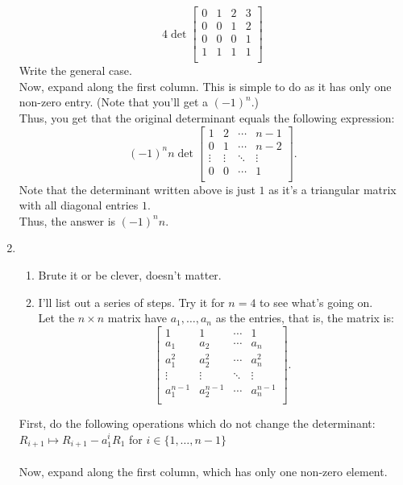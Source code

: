 \documentclass{article}
\begin{document}
\begin{enumerate}
\[	4\det \begin{bmatrix}
		0 & 1 & 2 & 3\\
		0 & 0 & 1 & 2\\
		0 & 0 & 0 & 1\\
		1 & 1 & 1 & 1\\
	\end{bmatrix}\]
	Write the general case.\\
	Now, expand along the first column. This is simple to do as it has only one non-zero entry. (Note that you'll get a $(-1)^n$.)\\
	Thus, you get that the original determinant equals the following expression:
	\[(-1)^nn\det \begin{bmatrix}
		1 & 2 & \cdots & n-1\\
		0 & 1 & \cdots & n-2\\
		\vdots & \vdots & \ddots & \vdots \\
		0 & 0 & \cdots & 1\\
	\end{bmatrix}.\]
	Note that the determinant written above is just $1$ as it's a triangular matrix with all diagonal entries $1.$\\
	Thus, the answer is $(-1)^nn.$
	\item 
	\begin{enumerate} 
		\item Brute it or be clever, doesn't matter.
		\item I'll list out a series of steps. Try it for $n = 4$ to see what's going on.\\
		Let the $n \times n$ matrix have $a_1, \ldots, a_n$ as the entries, that is, the matrix is:
		\[\begin{bmatrix}
			1 & 1 & \cdots & 1\\
			a_1 & a_2 & \cdots & a_n\\
			a_1^2 & a_2^2 & \cdots & a_n^2\\
			\vdots & \vdots & \ddots & \vdots \\
			a_1^{n-1} & a_2^{n-1} & \cdots & a_n^{n-1}\\
		\end{bmatrix}.\]
	\end{enumerate}
	First, do the following operations which do not change the determinant:\\
	$R_{i+1} \mapsto R_{i+1} -a_1^iR_1$ for $i \in \{1,\ldots,n-1\}$\\~\\
	Now, expand along the first column, which has only one non-zero element.\\

\end{enumerate}
\end{document}
